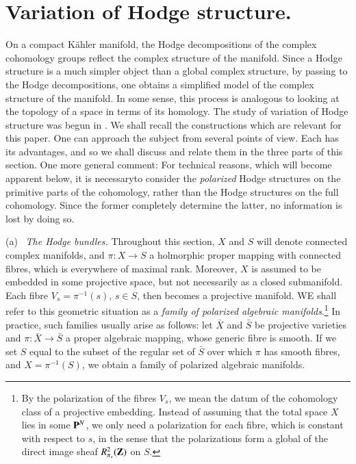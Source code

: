 \section{Variation of Hodge structure.}\label{art4-sec3}
On a compact K\"ahler manifold, the Hodge decompositions of the complex cohomology groups reflect the complex structure of the manifold. Since a Hodge structure is a much simpler object than a global complex structure, by passing to the Hodge decompositions, one obtains a simplified model of the complex structure of the manifold. In some sense, this process is analogous to looking at the topology of a space in terms of its homology. The study of variation of Hodge structure was begun in \cite{art4-key18,art4-key19}. We shall recall the constructions which are relevant for this paper. One can approach the subject from several points of view. Each has its advantages, and so we shall discuss and relate them in the three parts of this section. One more general comment: For technical reasons, which will become apparent below, it is necessary\pageoriginale to consider the \textit{polarized} Hodge structures on the primitive parts of the cohomology, rather than the Hodge structures on the full cohomology. Since the former completely determine the latter, no information is lost by doing so.

\medskip
\noindent
(a)~ \textit{The Hodge bundles.} Throughout this section, $X$ and $S$  will denote connected complex manifolds, and $\pi : X \to S$ a holmorphic proper mapping with connected fibres, which is everywhere of maximal rank. Moreover, $X$ is assumed to be embedded in some projective space, but not necessarily as a closed submanifold. Each fibre $V_s = \pi^{-1} (s)$, $s \in S$, then becomes a projective manifold. WE shall refer to this geometric situation as a \textit{family of polarized algebraic manifolds}.\footnote[7]{By the polarization of the fibres $V_s$, we mean the datum of the cohomology class of a projective embedding. Instead of assuming that the total space $X$ lies in some $\mathbf{P}^N$, we only need a polarization for each fibre, which is constant with respect to $s$, in the sense that the polarizations form a global of the direct image sheaf $R^2_{\pi_\ast} (\mathbf{Z})$ on $S$.} In practice, such families usually arise as follows: let $\bar{X}$ and $\bar{S}$ be projective varieties and $\pi: \bar{X} \to \bar{S}$ a proper algebraic mapping, whose generic fibre is smooth. If we set $S$ equal to the subset of the regular set of $\bar{S}$ over which $\pi$ has smooth fibres, and $X= \pi^{-1} (S)$, we obtain a family of polarized algebraic manifolds.

